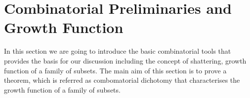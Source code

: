 \section{Combinatorial Preliminaries and Growth Function}

In this section we are going to introduce the basic combinatorial tools that provides the basis for our discussion including the concept of shattering, growth function of a family of subsets. The main aim of this section is to prove a theorem, which is referred as combomatorial dichotomy that characterises the growth function of a family of subsets.


